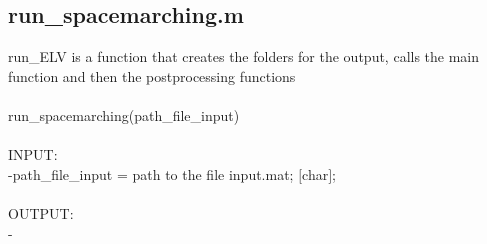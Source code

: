 \subsection{run\_spacemarching.m}
run\_ELV is a function that creates the folders for the output, calls the main function and then the postprocessing functions \\ 
 \\ 
run\_spacemarching(path\_file\_input) \\ 
 \\ 
INPUT: \\ 
   -path\_file\_input = path to the file input.mat; $[$char$]$; \\ 
 \\ 
OUTPUT: \\ 
   - \\ 
 \\ 
